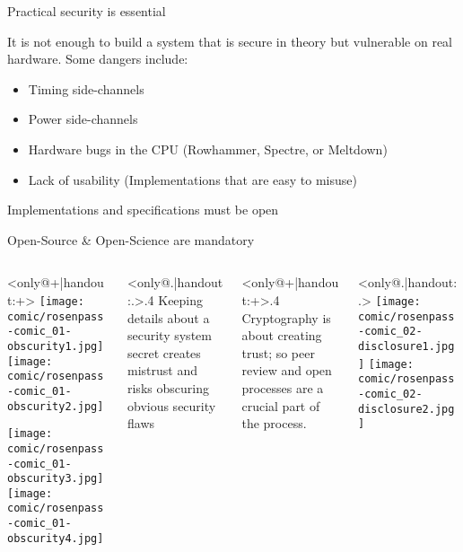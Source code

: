 \begin{frame}{Practical security is essential}
  \small

  It is not enough to build a system that is secure in theory but vulnerable on real hardware.
  Some dangers include:

  \begin{itemize}
    \item Timing side-channels
    \item Power side-channels
    \item Hardware bugs in the CPU (Rowhammer, Spectre, or Meltdown)
    \item Lack of usability (Implementations that are easy to misuse)
  \end{itemize}
\end{frame}

\begin{frame}{Implementations and specifications must be open}
\end{frame}


\begin{frame}{Open-Source \& Open-Science are mandatory}
  \begin{columns}[onlytextwidth,c]
      \begin{column}<only@+|handout:+>{}
        \texttt{[image: comic/rosenpass-comic\_01-obscurity1.jpg]}%
        \texttt{[image: comic/rosenpass-comic\_01-obscurity2.jpg]}

        \texttt{[image: comic/rosenpass-comic\_01-obscurity3.jpg]}%
        \texttt{[image: comic/rosenpass-comic\_01-obscurity4.jpg]}
      \end{column}
		
      \begin{column}<only@.|handout:.>{.4\linewidth}
        Keeping details about a security system secret creates mistrust and risks obscuring obvious security flaws
      \end{column}

      \begin{column}<only@+|handout:+>{.4\linewidth}
        Cryptography is about creating trust; so peer review and open processes are a crucial part of the process.
      \end{column}
	\hfill
      \begin{column}<only@.|handout:.>{}
        \texttt{[image: comic/rosenpass-comic\_02-disclosure1.jpg]}%
        \texttt{[image: comic/rosenpass-comic\_02-disclosure2.jpg]}
      \end{column}
  \end{columns}
\end{frame}

